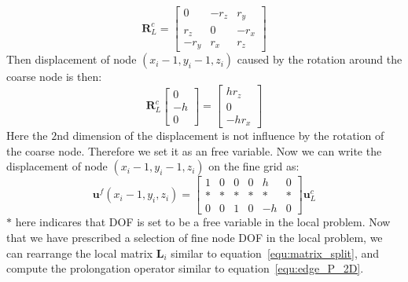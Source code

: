 \begin{equation}
\mathbf{R}^c_L = \begin{bmatrix} 
0 & -r_z & r_y\\
r_z & 0 & -r_x \\
-r_y & r_x & r_z
\end{bmatrix}
\end{equation}
Then displacement of node $(x_i - 1, y_i - 1, z_i)$ caused by the rotation around the coarse node is then:
\begin{equation}
\mathbf{R}^c_L  \left[\begin{array}{c} 0\\-h\\0\end{array}\right] = \left[\begin{array}{c} hr_z\\0\\-hr_x\end{array}\right]
\end{equation}
Here the $2$nd dimension of the displacement is not influence by the rotation of the coarse node. Therefore we set it as an free variable. Now we can write the displacement of node $(x_i - 1, y_i - 1, z_i)$ on the fine grid as:
 \begin{equation}
 \mathbf{u}^f(x_i - 1, y_i, z_i) = \begin{bmatrix} 
 1 & 0 & 0 & 0 & h & 0\\
 * & * & * & * & * & *\\
 0 & 0 & 1 & 0 & -h & 0 \end{bmatrix} \mathbf{u}^c_L
 \end{equation}
 $*$ here indicares that DOF is set to be a free variable in the local problem. Now that we have prescribed a selection of fine node DOF in the local problem, we can rearrange the local matrix $\mathbf{L}_i$ similar to equation~\ref{equ:matrix_split}, and compute the prolongation operator similar to equation~\ref{equ:edge_P_2D}.
